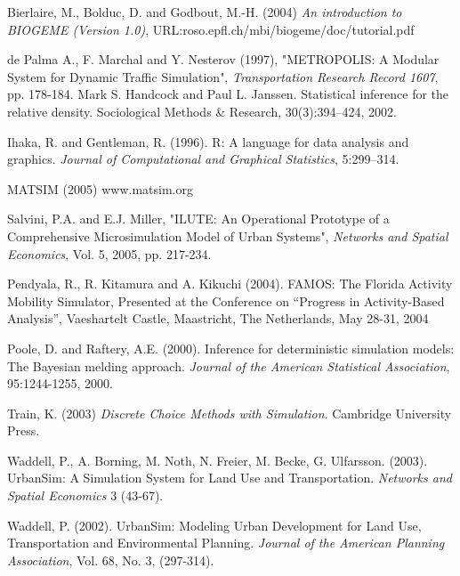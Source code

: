 Bierlaire, M., Bolduc, D. and Godbout, M.-H. (2004) \emph{An introduction to BIOGEME (Version 1.0)}, URL:roso.epfl.ch/mbi/biogeme/doc/tutorial.pdf

de Palma A., F. Marchal and Y. Nesterov (1997), "METROPOLIS: A Modular System for Dynamic Traffic Simulation", \emph{Transportation Research Record 1607}, pp. 178-184.
Mark S. Handcock and Paul L. Janssen. Statistical inference for the relative density. Sociological Methods \& Research, 30(3):394–424, 2002.

Ihaka, R. and Gentleman, R. (1996).  R: A language for data analysis and graphics.  \emph{Journal of Computational and Graphical Statistics}, 5:299--314.

MATSIM (2005) www.matsim.org

Salvini, P.A. and E.J. Miller, "ILUTE: An Operational Prototype of a Comprehensive Microsimulation Model of Urban Systems", \emph{Networks and Spatial Economics}, Vol. 5, 2005, pp. 217-234.

Pendyala, R., R. Kitamura and A. Kikuchi (2004). FAMOS: The Florida Activity Mobility Simulator, Presented at the Conference on “Progress in Activity-Based Analysis”, Vaeshartelt Castle, Maastricht, The Netherlands, May 28-31, 2004

Poole, D. and Raftery, A.E. (2000). Inference for deterministic simulation models: The Bayesian melding approach. \emph{Journal of the American Statistical Association}, 95:1244-1255, 2000.

Train, K. (2003) \emph{Discrete Choice Methods with Simulation}.  Cambridge University Press.

Waddell, P., A. Borning, M. Noth, N. Freier, M. Becke, G. Ulfarsson. (2003). UrbanSim: A Simulation System for Land Use and Transportation. \emph{Networks and Spatial Economics} 3 (43-67).

Waddell, P. (2002).  UrbanSim: Modeling Urban Development for Land Use, Transportation and Environmental Planning. \emph{ Journal of the American Planning Association}, Vol. 68, No. 3, (297-314).


